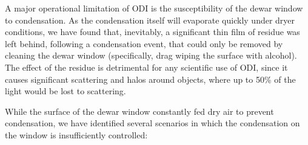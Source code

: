 \documentclass[]{spieman}
\begin{document}
A major operational limitation of ODI is the susceptibility of the dewar window
to condensation. As the condensation itself will evaporate quickly under dryer
conditions, we have found that, inevitably, a significant thin film of residue
was left behind, following a condensation event, that could only be removed by
cleaning the dewar window (specifically, drag wiping the surface with alcohol).
The effect of the residue is detrimental for any scientific use of ODI, since it
causes significant scattering and halos around objects, where up to 50\%  of the
light would be lost to scattering.

While the surface of the dewar window constantly fed dry air to prevent
condensation, we have identified several scenarios in which the condensation  on
the window is insufficiently controlled:
\end{document}

